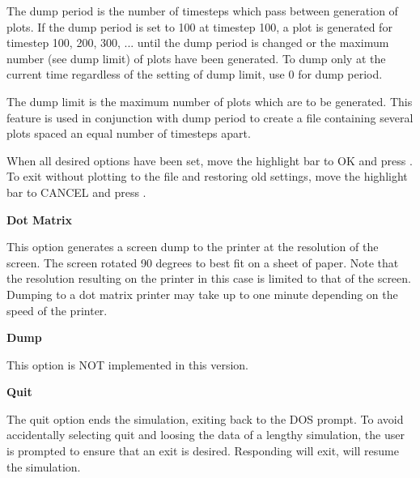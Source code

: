 \begin{section}
\begin{subsection}
\begin{subsubsection}
\noindent
      The dump period is the number of timesteps which pass between generation
      of plots.  If the dump period is set to 100 at timestep 100, a plot is
      generated for timestep 100, 200, 300, ... until the dump period is
      changed or the maximum number (see dump limit) of plots have been
      generated.  To dump only at the current time regardless of the setting of
      dump limit, use 0 for dump period.
\vspace{.2in}

\noindent
      The dump limit is the maximum number of plots which are to be generated.
      This feature is used in conjunction with dump period to create a file
      containing several plots spaced an equal number of timesteps apart.
\vspace{.2in}

\noindent
      When all desired options have been set, move the highlight bar to OK and
      press .  To exit without plotting to the file and restoring
      old settings, move the highlight bar to CANCEL and press .
\end{subsubsection}

\begin{subsubsection}
{\bf Dot Matrix}

      This option generates a screen dump to the printer at the resolution of
      the screen.  The screen rotated 90 degrees to best fit on a sheet of
      paper.  Note that the resolution resulting on the printer in this case is
      limited to that of the screen.  Dumping to a dot matrix printer may take
      up to one minute depending on the speed of the printer.
\end{subsubsection}

\begin{subsubsection}
{\bf Dump}

      This option is NOT implemented in this version.
\end{subsubsection}
\end{subsection}

\begin{subsection}
{\bf Quit}

   The quit option ends the simulation, exiting back to the DOS prompt.  To
   avoid accidentally selecting quit and loosing the data of a lengthy
   simulation, the user is prompted to ensure that an exit is desired.
   Responding  will exit,  will resume the simulation.
\end{subsection}


\end{section}

